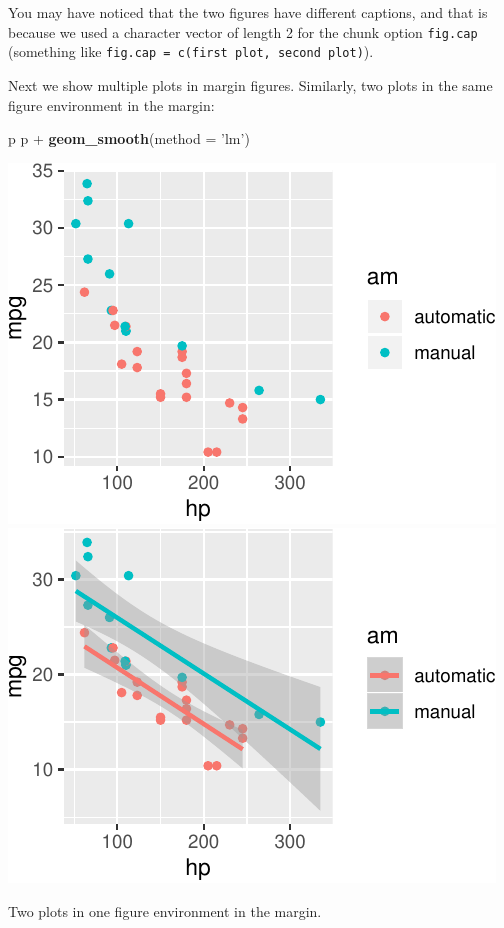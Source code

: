 \documentclass[]{tufte-handout}
\newenvironment{Shaded}{}{}
\newcommand{\KeywordTok}[1]{\textcolor[rgb]{0.00,0.44,0.13}{\textbf{#1}}}
\newcommand{\DataTypeTok}[1]{\textcolor[rgb]{0.56,0.13,0.00}{#1}}
\newcommand{\StringTok}[1]{\textcolor[rgb]{0.25,0.44,0.63}{#1}}
\newcommand{\OperatorTok}[1]{\textcolor[rgb]{0.40,0.40,0.40}{#1}}
\newcommand{\NormalTok}[1]{#1}
\begin{document}
You may have noticed that the two figures have different captions, and
that is because we used a character vector of length 2 for the chunk
option \texttt{fig.cap} (something like
\texttt{fig.cap\ =\ c(\textquotesingle{}first\ plot\textquotesingle{},\ \textquotesingle{}second\ plot\textquotesingle{})}).

Next we show multiple plots in margin figures. Similarly, two plots in
the same figure environment in the margin:

\begin{Shaded}
\begin{Highlighting}[]
\NormalTok{p}
\NormalTok{p }\OperatorTok{+}\StringTok{ }\KeywordTok{geom_smooth}\NormalTok{(}\DataTypeTok{method =} \StringTok{'lm'}\NormalTok{)}
\end{Highlighting}
\end{Shaded}

\begin{marginfigure}
\includegraphics{handout-twitter-analysis_files/figure-latex/fig-margin-together-1} \includegraphics{handout-twitter-analysis_files/figure-latex/fig-margin-together-2} \caption[Two plots in one figure environment in the margin]{Two plots in one figure environment in the margin.}\label{fig:fig-margin-together}
\end{marginfigure}
\end{document}

